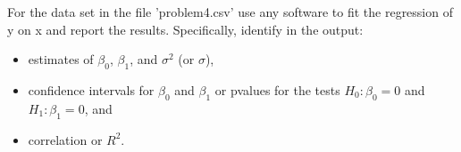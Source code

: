 \item For the data set in the file 'problem4.csv' use any software to fit the 
regression of y on x and report the results. Specifically, identify in the 
output:
\begin{itemize}
\item estimates of $\beta_0$, $\beta_1$, and $\sigma^2$ (or $\sigma$),
\item confidence intervals for $\beta_0$ and $\beta_1$ or pvalues for the tests
$H_0: \beta_0=0$ and $H_1: \beta_1=0$, and
\item correlation or $R^2$. 
\end{itemize} 



% 
% 
% 
% 
% 
% 
% 
